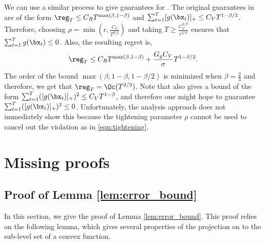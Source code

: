 We can use a similar process to give guarantees for \citet{yuan2018online}.
The original guarantees in \citet{yuan2018online} are of the form $\reg_T \leq C_R T^{\max(\beta,1-\beta)}$ and $\sum_{t=1}^{T} [g(\bx_t)]_+ \leq C_V T^{1 - \beta/2}$.
Therefore, choosing $\rho = \min\left( \epsilon, \frac{C_V}{T^{\beta/2}} \right)$ and taking $T \geq \frac{C_V^{2/\beta}}{\epsilon^{2/\beta}}$ ensures that $\sum_{t=1}^{T} g(\bx_t) \leq 0$.
Also, the resulting regret is,
\begin{equation*}
    \reg_T \leq C_R T^{\max(\beta,1-\beta)} + \frac{G_g C_V}{\sigma} T^{1 - \beta/2}.
\end{equation*}
The order of the bound $\max(\beta,1-\beta,1-\beta/2)$ is minimized when $\beta = \frac{2}{3}$ and therefore, we get that $\reg_T = \Oc(T^{2/3})$.
Note that \citet{yuan2018online} also gives a bound of the form $\sum_{t=1}^{T} ([g(\bx_t)]_+)^2 \leq C_V T^{1 - \beta}$, and therefore one might hope to guarantee $\sum_{t=1}^{T} ([g(\bx_t)]_+)^2 \leq 0$.
Unfortunately, the analysis approach does not immediately show this because the tightening parameter $\rho$ cannot be used to cancel out the violation as in \eqref{eqn:tightening}.

\section{Missing proofs}
\label{apx:ogd_pfs}

\subsection{Proof of Lemma \ref{lem:error_bound}}
\label{apx:err_bound}

In this section, we give the proof of Lemma \ref{lem:error_bound}.
This proof relies on the following lemma, which gives several properties of the projection on to the sub-level set of a convex function.

